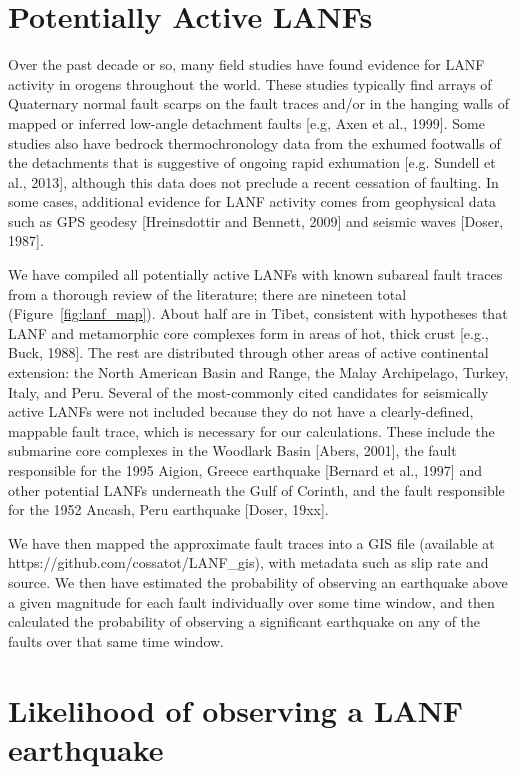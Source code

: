 \documentclass[twocolumn,grl]{AGUTeX}
\begin{document}
\begin{article}
\section{Potentially Active LANFs}

Over the past decade or so, many field studies have found evidence for LANF activity in orogens throughout the world. These studies typically find arrays of Quaternary normal fault scarps on the fault traces and/or in the hanging walls of mapped or inferred low-angle detachment faults [e.g, Axen et al., 1999]. Some studies also have bedrock thermochronology data from the exhumed footwalls of the detachments that is suggestive of ongoing rapid exhumation [e.g. Sundell et al., 2013], although this data does not preclude a recent cessation of faulting. In some cases, additional evidence for LANF activity comes from geophysical data such as GPS geodesy [Hreinsdottir and Bennett, 2009] and seismic waves [Doser, 1987].

We have compiled all potentially active LANFs with known subareal fault traces from a thorough review of the literature; there are nineteen total (Figure~\ref{fig:lanf_map}).  About half are in Tibet, consistent with hypotheses that LANF and metamorphic core complexes form in areas of hot, thick crust [e.g., Buck, 1988].  The rest are distributed through other areas of active continental extension: the North American Basin and Range, the Malay Archipelago, Turkey, Italy, and Peru. Several of the most-commonly cited candidates for seismically active LANFs were not included because they do not have a clearly-defined, mappable fault trace, which is necessary for our calculations.  These include the submarine core complexes in the Woodlark Basin [Abers, 2001], the fault responsible for the 1995 Aigion, Greece earthquake [Bernard et al., 1997] and other potential LANFs underneath the Gulf of Corinth, and the fault responsible for the 1952 Ancash, Peru earthquake [Doser, 19xx].

We have then mapped the approximate fault traces into a GIS file (available at https://github.com/cossatot/LANF\_gis), with metadata such as slip rate and source. We then have estimated the probability of observing an earthquake above a given magnitude for each fault individually over some time window, and then calculated the probability of observing a significant earthquake on any of the faults over that same time window.

\section{Likelihood of observing a LANF earthquake}

\end{article}
\end{document}
